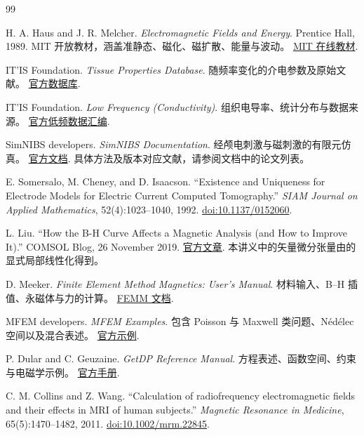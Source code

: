 \begin{thebibliography}{99}
\small\raggedright\setlength{\itemsep}{5pt}\setlength{\parskip}{0pt}
 H. A. Haus and J. R. Melcher. \emph{Electromagnetic Fields and Energy}. Prentice Hall, 1989. MIT 开放教材，涵盖准静态、磁化、磁扩散、能量与波动。 \href{https://web.mit.edu/6.013_book/www/book.html}{MIT 在线教材}.

 IT'IS Foundation. \emph{Tissue Properties Database}. 随频率变化的介电参数及原始文献。 \href{https://itis.swiss/virtual-population/tissue-properties/database}{官方数据库}.

 IT'IS Foundation. \emph{Low Frequency (Conductivity)}. 组织电导率、统计分布与数据来源。 \href{https://itis.swiss/virtual-population/tissue-properties/database/low-frequency-conductivity}{官方低频数据汇编}.

 SimNIBS developers. \emph{SimNIBS Documentation}. 经颅电刺激与磁刺激的有限元仿真。 \href{https://simnibs.github.io/simnibs/}{官方文档}. 具体方法及版本对应文献，请参阅文档中的论文列表。

 E. Somersalo, M. Cheney, and D. Isaacson. ``Existence and Uniqueness for Electrode Models for Electric Current Computed Tomography.'' \emph{SIAM Journal on Applied Mathematics}, 52(4):1023--1040, 1992. \href{https://doi.org/10.1137/0152060}{doi:10.1137/0152060}.

 L. Liu. ``How the B-H Curve Affects a Magnetic Analysis (and How to Improve It).'' COMSOL Blog, 26 November 2019. \href{https://www.comsol.com/blogs/how-the-b-h-curve-affects-a-magnetic-analysis-and-how-to-improve-it}{官方文章}. 本讲义中的矢量微分张量由的显式局部线性化得到。

 D. Meeker. \emph{Finite Element Method Magnetics: User's Manual}. 材料输入、B--H 插值、永磁体与力的计算。 \href{https://www.femm.info/wiki/Documentation/}{FEMM 文档}.

 MFEM developers. \emph{MFEM Examples}. 包含 Poisson 与 Maxwell 类问题、N\'ed\'elec 空间以及混合表述。 \href{https://mfem.org/examples/}{官方示例}.

 P. Dular and C. Geuzaine. \emph{GetDP Reference Manual}. 方程表述、函数空间、约束与电磁学示例。 \href{https://getdp.info/doc/texinfo/getdp.html}{官方手册}.

 C. M. Collins and Z. Wang. ``Calculation of radiofrequency electromagnetic fields and their effects in MRI of human subjects.'' \emph{Magnetic Resonance in Medicine}, 65(5):1470--1482, 2011. \href{https://doi.org/10.1002/mrm.22845}{doi:10.1002/mrm.22845}.


\end{thebibliography}
